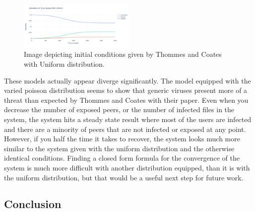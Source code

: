 \documentclass[12pt, oneside]{article}
\begin{document}
        \begin{figure}[htbp]
            \centering
            \includegraphics[width=0.5\textwidth]{2MUniform.png}
            \caption{Image depicting initial conditions given by Thommes and Coates with Uniform distribution.}
        \end{figure}
        These models actually appear diverge significantly. The model equipped with the varied poisson distribution seems to show that generic viruses present more of a threat than expected by Thommes and Coates
        with their paper. Even when you decrease the number of exposed peers, or the number of infected files in the system, the system hits a steady state result where
        most of the users are infected and there are a minority of peers that are not infected or exposed at any point. However, if you half the time it takes to recover, the system looks much more similar to the
        system given with the uniform distribution and the otherwise identical conditions. Finding a closed form formula for the convergence of the system is much more difficult with another distribution equipped, 
        than it is with the uniform distribution, but that would be a useful next step for future work. 
    
    \subsection{Conclusion}





\end{document}
